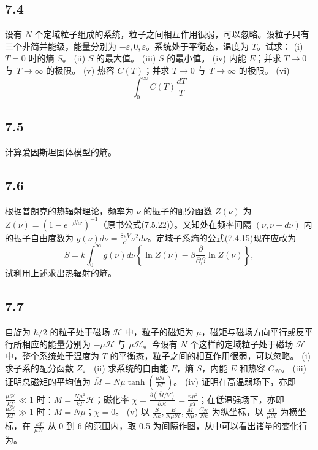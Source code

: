 \newpage
\subsection{7.4}
设有 $N$ 个定域粒子组成的系统，粒子之间相互作用很弱，可以忽略。设粒子只有三个非简并能级，能量分别为 $-\varepsilon, 0, \varepsilon$。系统处于平衡态，温度为 $T$。试求：
(i) $T = 0$ 时的熵 $S$。
(ii) $S$ 的最大值。
(iii) $S$ 的最小值。
(iv) 内能 $E$；并求 $T \to 0$ 与 $T \to \infty$ 的极限。
(v) 热容 $C(T)$；并求 $T \to 0$ 与 $T \to \infty$ 的极限。
(vi) $$\int_{0}^{\infty} C(T) \frac{dT}{T}$$

\newpage
\subsection{7.5}
计算爱因斯坦固体模型的熵。

\newpage
\subsection{7.6}
根据普朗克的热辐射理论，频率为 $\nu$ 的振子的配分函数 $Z(\nu)$ 为 $Z(\nu) = (1 - e^{-\beta h\nu})^{-1}$（原书公式(7.5.22)）。又知处在频率间隔 $(\nu, \nu + d\nu)$ 内的振子自由度数为 $g(\nu)d\nu = \frac{8\pi V}{c^3}\nu^2 d\nu$。定域子系熵的公式(7.4.15)现在应改为
$$S = k \int_0^\infty g(\nu)d\nu \left\{ \ln Z(\nu) - \beta \frac{\partial}{\partial \beta} \ln Z(\nu) \right\},$$
试利用上述求出热辐射的熵。

\newpage
\subsection{7.7}
自旋为 $\hbar/2$ 的粒子处于磁场 $\mathcal{H}$ 中，粒子的磁矩为 $\mu$，磁矩与磁场方向平行或反平行所相应的能量分别为 $-\mu\mathcal{H}$ 与 $\mu\mathcal{H}$。今设有 $N$ 个这样的定域粒子处于磁场 $\mathcal{H}$ 中，整个系统处于温度为 $T$ 的平衡态，粒子之间的相互作用很弱，可以忽略。
(i) 求子系的配分函数 $Z$。
(ii) 求系统的自由能 $F$，熵 $S$，内能 $E$ 和热容 $C_{\mathcal{H}}$。
(iii) 证明总磁矩的平均值为 $\overline{M} = N\mu\tanh\left(\frac{\mu\mathcal{H}}{kT}\right)$。
(iv) 证明在高温弱场下，亦即 $\frac{\mu\mathcal{H}}{kT} \ll 1$ 时：$\overline{M} = \frac{N\mu^2}{kT}\mathcal{H}$；磁化率 $\chi = \frac{\partial (\overline{M}/V)}{\partial \mathcal{H}} = \frac{n\mu^2}{kT}$；在低温强场下，亦即 $\frac{\mu\mathcal{H}}{kT} \gg 1$ 时：$\overline{M} = N\mu$；$\chi = 0$。
(v) 以 $\frac{S}{Nk}, \frac{E}{N\mu\mathcal{H}}, \frac{\overline{M}}{N\mu}, \frac{C_{\mathcal{H}}}{Nk}$ 为纵坐标，以 $\frac{kT}{\mu\mathcal{H}}$ 为横坐标，在 $\frac{kT}{\mu\mathcal{H}}$ 从 0 到 6 的范围内，取 0.5 为间隔作图，从中可以看出诸量的变化行为。


